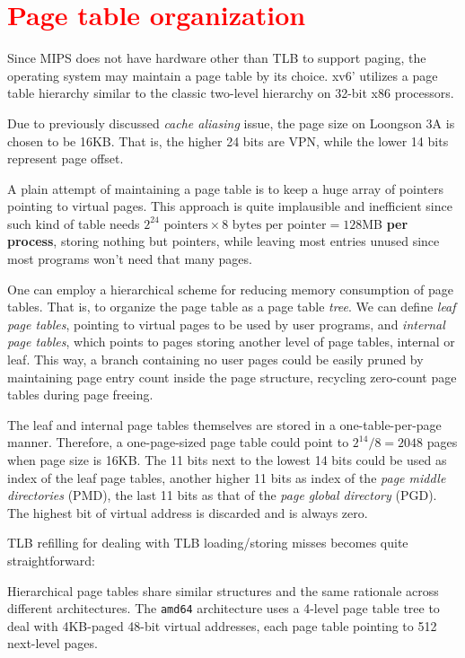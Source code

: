 \documentclass{report}
\def \hilite#1{\textcolor{red}{#1}}
\newenvironment{hilight}{\color{red}}{\color{black}}
\begin{document}
	\section{\hilite{Page table organization}}
	\begin{hilight}
		Since MIPS does not have hardware other than TLB to support paging, the operating system may
		maintain a page table by its choice.  xv6' utilizes a page table hierarchy similar to the
		classic two-level hierarchy on 32-bit x86 processors.
		
		Due to previously discussed \emph{cache aliasing} issue, the page size on Loongson 3A is chosen
		to be 16KB.  That is, the higher 24 bits are VPN, while the lower 14 bits represent page offset.
		
		A plain attempt of maintaining a page table is to keep a huge array of pointers
		pointing to virtual pages.  This approach is quite implausible and inefficient since such kind
		of table needs $2^{24}\text{ pointers}\times 8\text{ bytes per pointer}=128$MB \textbf{per process},
		storing nothing but pointers, while leaving most entries unused since most programs won't need that
		many pages.
		
		One can employ a hierarchical scheme for reducing memory consumption of page tables.  That is, to
		organize the page table as a page table \emph{tree}.
		We can define \emph{leaf page tables}, pointing
		to virtual pages to be used by user programs, and \emph{internal page tables}, which points to pages
		storing another level of page tables, internal or leaf.  This way, a branch containing no
		user pages could be easily pruned by maintaining page entry count inside the page structure,
		recycling zero-count page tables during page freeing.
		\marginpar{
			\footnotesize\ttfamily
			\hilite{arch/mips/mm/hier/\\pgtable.c:199}
		}
		
		The leaf and internal page tables themselves
		are stored in a one-table-per-page manner.  Therefore, a one-page-sized page table could point to
		$2^{14}/8=2048$ pages
		when page size is 16KB.  The 11 bits next to the lowest 14 bits could be used as index of the leaf
		page tables, another higher 11 bits as index of the \emph{page middle directories} (PMD), the last
		11 bits as that of the \emph{page global directory} (PGD).  The highest bit of virtual address is
		discarded and is always zero.
		
		TLB refilling for dealing with TLB loading/storing misses becomes quite straightforward:
		
		Hierarchical page tables share similar structures and the same rationale across different
		architectures.  The \texttt{amd64}
		architecture uses a 4-level page table tree to deal with 4KB-paged 48-bit virtual addresses, each page
		table pointing to 512 next-level pages.
	\end{hilight}
	
\end{document}

